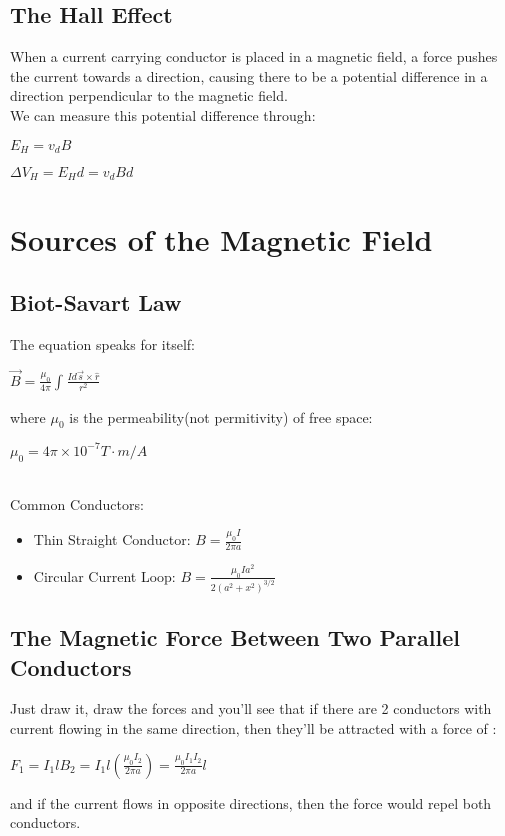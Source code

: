 \documentclass[12pt]{report}
\begin{document}
	\section{The Hall Effect}
		When a current carrying conductor is placed in a magnetic field, a force pushes the current towards a direction, causing there to be a potential difference in a direction perpendicular to the magnetic field.\\
		We can measure this potential difference through:\\
		\centerline{$E_H = v_dB$}
		\centerline{$\Delta V_H = E_Hd = v_dBd$}
\chapter{Sources of the Magnetic Field}
	\section{Biot-Savart Law}
		The equation speaks for itself:\\
		\centerline{$\vec{B} = \frac{\mu_0}{4\pi} \int_{}^{}\frac{Id\vec{s} \times \hat{r}}{r^2}$}
		where $\mu_0$ is the permeability(not permitivity) of free space:\\
		\centerline{$\mu_0 = 4\pi \times 10^{-7} T \cdot m/A$}
		\\
		Common Conductors:\\
		\begin{itemize}
			\item Thin Straight Conductor: $B = \frac{\mu_0 I}{2\pi a}$
			\item Circular Current Loop: $B = \frac{\mu_0 Ia^2}{2(a^2+x^2)^{3/2}}$
		\end{itemize}
	\section{The Magnetic Force Between Two Parallel Conductors}
		Just draw it, draw the forces and you'll see that if there are 2 conductors with current flowing in the same direction, then they'll be attracted with a force of :\\
		\centerline{$F_1 = I_1lB_2 = I_1l(\frac{\mu_0I_2}{2\pi a}) = \frac{\mu_0I_1I_2}{2\pi a}l$}
		and if the current flows in opposite directions, then the force would repel both conductors.
\end{document}
